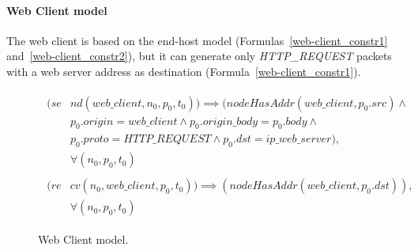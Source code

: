\paragraph{Web Client model} The web client is based on the end-host model (Formulas~\ref{web-client_constr1} and~\ref{web-client_constr2}), but it can generate only \textit{HTTP\_REQUEST} packets with a web server address as destination (Formula~\ref{web-client_constr1}).
\begin{figure}[h]
	{\footnotesize
		\begin{subequations}
			\begin{align}
				\begin{split}
					\label{web-client_constr1}
					(se& nd(web\_client , n_{0}, p_{0}, t_{0})) \implies (nodeHasAddr(web\_client, p_{0}.src) \wedge \\
					& p_{0}.origin = web\_client \wedge p_{0}.origin\_body = p_{0}.body \wedge \\
					& p_{0}.proto = HTTP\_REQUEST \wedge p_{0}.dst = ip\_web\_server), \\
					& \forall (n_{0}, p_{0}, t_{0})
				\end{split} \\
				\begin{split}
					\label{web-client_constr2}
					(re& cv(n_{0}, web\_client, p_{0}, t_{0})) \implies  (nodeHasAddr(web\_client, p_{0}.dst)), \\
					& \forall (n_{0}, p_{0}, t_{0})
				\end{split}
			\end{align}
		\end{subequations}
	}%
	\caption{Web Client model.}
	\label{web-client_model}
\end{figure}

